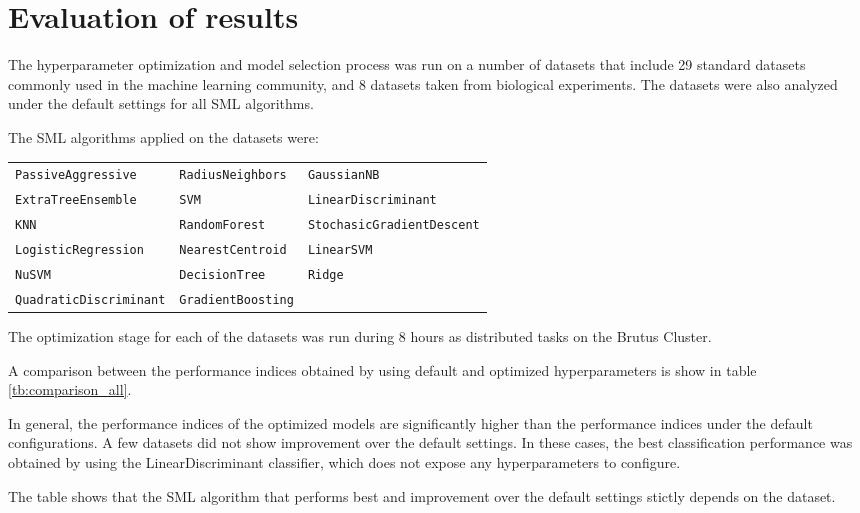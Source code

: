 \chapter{Evaluation of results}


The hyperparameter optimization and model selection process was run on a number of datasets that
include 29 standard datasets commonly used in the machine learning community, and 8 datasets taken from
biological experiments. The datasets were also analyzed under the default settings for all SML
algorithms.

The SML algorithms applied on the datasets were:

\begin{tabularx}{\textwidth}{l l l}
\texttt{PassiveAggressive} &
\texttt{RadiusNeighbors} &
\texttt{GaussianNB} \\
\texttt{ExtraTreeEnsemble} &
\texttt{SVM} &
\texttt{LinearDiscriminant} \\
\texttt{KNN} &
\texttt{RandomForest} &
\texttt{StochasicGradientDescent} \\
\texttt{LogisticRegression} &
\texttt{NearestCentroid} & 
\texttt{LinearSVM}\\
\texttt{NuSVM} &
\texttt{DecisionTree} &
\texttt{Ridge} \\
\texttt{QuadraticDiscriminant} &
\texttt{GradientBoosting} &
\end{tabularx}


The optimization stage for each of the datasets was run during 8 hours as distributed tasks on the
Brutus Cluster.

A comparison between the performance indices obtained by using default and optimized hyperparameters
is show in table \ref{tb:comparison_all}.

In general, the performance indices of the optimized models are significantly higher than the
performance indices under the default configurations. A few datasets did not show improvement over
the default settings. In these cases, the best classification performance was obtained by using the
LinearDiscriminant classifier, which does not expose any hyperparameters to configure.

The table shows that the SML algorithm that performs best and improvement over the default settings stictly
depends on the dataset.

%


